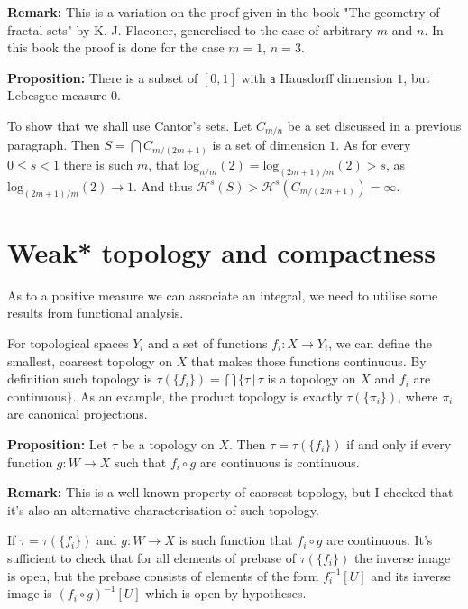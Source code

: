 \documentclass{article}
\begin{document}
\vspace{1ex}
\textbf{Remark:} This is a variation on the proof given in the book "The geometry
of fractal sets" by K. J. Flaconer, generelised to the case of arbitrary $m$ and
$n$. In this book the proof is done for the case $m=1$, $n=3$.

\vspace{1ex}
\textbf{Proposition:} There is a subset of $[0,1]$ with а Hausdorff dimension
$1$, but Lebesgue measure 0.

\vspace{1ex}
To show that we shall use Cantor's sets. Let $C_{m/n}$ be a set discussed in a
previous paragraph. Then $S=\bigcap C_{m/(2m+1)}$ is a set of dimension $1$. As
for every $0\leq s<1$ there is such $m$, that $\text{log}_{n/m}(2)=\text{log}_{
(2m+1)/m}(2)>s$, as $\text{log}_{(2m+1)/m}(2)\rightarrow 1$. And thus $\mathcal
{H}^s(S)>\mathcal{H}^s(C_{m/(2m+1)})=\infty$.

\section{Weak* topology and compactness}
As to a positive measure we can associate an integral, we need to utilise some
results from functional analysis.
\vspace{1ex}

For topological spaces $Y_i$ and a set of functions $f_i:X\rightarrow Y_i$, we can
define the smallest, coarsest topology on $X$ that makes those functions continuous.
By definition such topology is $\tau(\{f_i\})=\bigcap\{\tau\,|\,
\tau$ is a topology on $X$ and $f_i$ are continuous$\}$. As an
example, the product topology is exactly $\tau(\{\pi_i\})$, where $\pi_i$ are
canonical projections.
\vspace{1ex}

\textbf{Proposition:} Let $\tau$ be a topology on $X$. Then $\tau=\tau(\{f_i\})$
if and only if every function $g:W\rightarrow X$ such that $f_i\circ g$ are
continuous is continuous.
\vspace{1ex}

\textbf{Remark:} This is a well-known property of caorsest topology, but I
checked that it's also an alternative characterisation of such topology.

If $\tau=\tau(\{f_i\})$ and $g:W\rightarrow X$ is such function that $f_i\circ
g$ are continuous. It's sufficient to check that for all elements of prebase
of $\tau(\{f_i\})$ the inverse image is open, but the prebase consists of
elements of the form $f_i^{-1}[U]$ and its inverse image is $(f_i\circ g)^{-1}[U]$
which is open by hypotheses.
\vspace{1ex}
\end{document}
